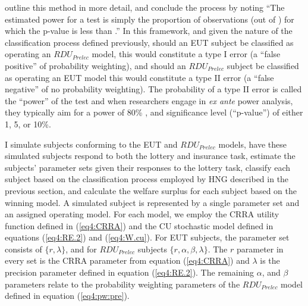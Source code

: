 \documentclass[../main.tex]{subfiles}
\begin{document}
\textcite[109]{Feiveson2002} outline this method in more detail, and conclude the process by noting \enquote{The estimated power for a  test is simply the proportion of observations (out of ) for which the p-value is less than .}
In this framework, and given the nature of the classification process defined previously, should an EUT subject be classified as operating an $\mathit{RDU_{Prelec}}$ model, this would constitute a type I error (a \enquote{false positive} of probability weighting), and should an $\mathit{RDU_{Prelec}}$ subject be classified as operating an EUT model this would constitute a type II error (a \enquote{false negative} of no probability weighting).
The probability of a type II error is called the \enquote{power} of the test and when researchers engage in \textit{ex ante} power analysis, they typically aim for a power of 80\% \parencite{Cohen1988, Gelman2014a}, and significance level (\enquote{p-value}) of either 1, 5, or 10\%.

I simulate subjects conforming to the EUT and $\mathit{RDU_{Prelec}}$ models, have these simulated subjects respond to both the lottery and insurance task, estimate the subjects' parameter sets given their responses to the lottery task, classify each subject based on the classification process employed by HNG described in the previous section, and calculate the welfare surplus for each subject based on the winning model.{\footnotemark}
A simulated subject is represented by a single parameter set and an assigned operating model.
For each model, we employ the CRRA utility function defined in (\ref{eq4:CRRA}) and the CU stochastic model defined in equations (\ref{eq4:RE.2}) and (\ref{eq4:W.cu}).
For EUT subjects, the parameter set consists of $\lbrace r, \lambda \rbrace$, and for $\mathit{RDU_{Prelec}}$ subjects $\lbrace r, \alpha, \beta, \lambda \rbrace$.
The $r$ parameter in every set is the CRRA parameter from equation (\ref{eq4:CRRA}) and $\lambda$ is the precision parameter defined in equation (\ref{eq4:RE.2}).
The remaining $\alpha$, and $\beta$ parameters relate to the probability weighting parameters of the $\mathit{RDU_{Prelec}}$ model defined in equation (\ref{eq4:pw:pre}).

\addtocounter{footnote}{-1}
\end{document}
